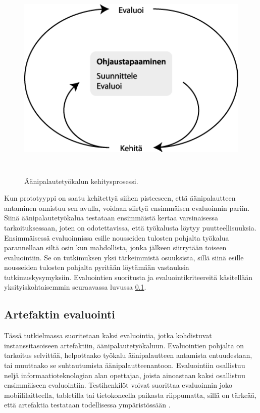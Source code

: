 \documentclass[utf8]{gradu3}
\begin{document}
\begin{figure}[h]\centering
  \includegraphics[height=10cm,keepaspectratio]{Kehitysprosessi}
  \caption{Äänipalautetyökalun kehitysprosessi.}
  \label{fig:kehitys}
\end{figure}

Kun prototyyppi on saatu kehitettyä siihen pisteeseen, että äänipalautteen antaminen onnistuu sen avulla, voidaan siirtyä ensimmäisen evaluoinnin pariin. Siinä äänipalautetyökalua testataan ensimmäistä kertaa varsinaisessa tarkoituksessaan, joten on odotettavissa, että työkalusta löytyy puutteellisuuksia. Ensimmäisessä evaluoinnissa esille nousseiden tulosten pohjalta työkalua parannellaan siltä osin kun mahdollista, jonka jälkeen siirrytään toiseen evaluointiin. Se on tutkimuksen yksi tärkeimmistä osuuksista, sillä siinä esille nousseiden tulosten pohjalta pyritään löytämään vastauksia tutkimuskysymyksiin. Evaluointien suoritusta ja evaluointikriteereitä käsitellään yksityiskohtaisemmin seuraavassa luvussa \ref{eval}.

\subsection{Artefaktin evaluointi}
\label{eval}

Tässä tutkielmassa suoritetaan kaksi evaluointia, jotka kohdistuvat instanssitasoiseen artefaktiin, äänipalautetyökaluun. Evaluointien pohjalta on tarkoitus selvittää, helpottaako työkalu äänipalautteen antamista entuudestaan, tai muuttaako se suhtautumista äänipalautteenantoon. Evaluointiin osallistuu neljä informaatioteknologian alan opettajaa, joista ainoastaan kaksi osallistuu ensimmäiseen evaluointiin. Testihenkilöt voivat suorittaa evaluoinnin joko mobiililaitteella, tabletilla tai tietokoneella paikasta riippumatta, sillä on tärkeää, että artefaktia testataan todellisessa ympäristössään \parencite{smith}.
\end{document}
